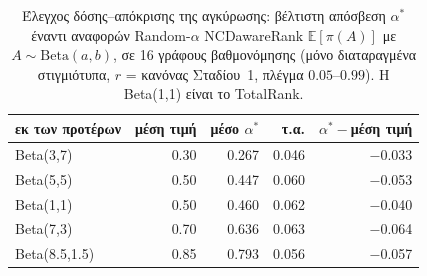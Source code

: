 \begin{table}[t]
\centering
\small
\caption{Έλεγχος δόσης--απόκρισης της αγκύρωσης: βέλτιστη απόσβεση $\alpha^*$ έναντι αναφορών Random-$\alpha$ NCDawareRank $\mathbb{E}[\pi(A)]$ με $A\sim\mathrm{Beta}(a,b)$, σε 16 γράφους βαθμονόμησης (μόνο διαταραγμένα στιγμιότυπα, $r$ = κανόνας Σταδίου~1, πλέγμα $0.05$--$0.99$). Η Beta(1,1) είναι το TotalRank.}
\label{tab:rapr}
\begin{tabular}{@{}lrrrr@{}}
\toprule
εκ των προτέρων & μέση τιμή & μέσο $\alpha^*$ & τ.α. & $\alpha^*-$μέση τιμή \\
\midrule
Beta(3,7) & 0.30 & 0.267 & 0.046 & $-$0.033 \\
Beta(5,5) & 0.50 & 0.447 & 0.060 & $-$0.053 \\
Beta(1,1) & 0.50 & 0.460 & 0.062 & $-$0.040 \\
Beta(7,3) & 0.70 & 0.636 & 0.063 & $-$0.064 \\
Beta(8.5,1.5) & 0.85 & 0.793 & 0.056 & $-$0.057 \\
\bottomrule
\end{tabular}
\end{table}

